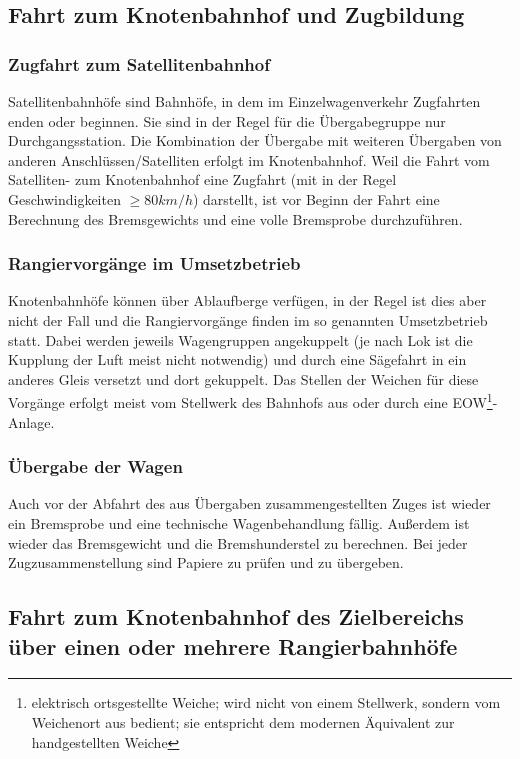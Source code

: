 \subsection{Fahrt zum Knotenbahnhof und Zugbildung}
\subsubsection{Zugfahrt zum Satellitenbahnhof}
Satellitenbahnhöfe sind Bahnhöfe, in dem im Einzelwagenverkehr Zugfahrten enden oder beginnen. Sie sind in der Regel für die Übergabegruppe nur Durchgangsstation. Die Kombination der Übergabe mit weiteren Übergaben von anderen Anschlüssen/Satelliten erfolgt im Knotenbahnhof. Weil die Fahrt vom Satelliten- zum Knotenbahnhof eine Zugfahrt (mit in der Regel Geschwindigkeiten $\ge 80 km/h$) darstellt, ist vor Beginn der Fahrt eine Berechnung des Bremsgewichts und eine volle Bremsprobe durchzuführen.%
\subsubsection{Rangiervorgänge im Umsetzbetrieb}
Knotenbahnhöfe können über Ablaufberge verfügen, in der Regel ist dies aber nicht der Fall und die Rangiervorgänge finden im so genannten Umsetzbetrieb statt. Dabei werden jeweils Wagengruppen angekuppelt (je nach Lok ist die Kupplung der Luft meist nicht notwendig) und durch eine Sägefahrt in ein anderes Gleis versetzt und dort gekuppelt. Das Stellen der Weichen für diese Vorgänge erfolgt meist vom Stellwerk des Bahnhofs aus oder durch eine EOW\footnote{elektrisch ortsgestellte Weiche; wird nicht von einem Stellwerk, sondern vom Weichenort aus bedient; sie entspricht dem modernen Äquivalent zur handgestellten Weiche}-Anlage.
\subsubsection{Übergabe der Wagen}
Auch vor der Abfahrt des aus Übergaben zusammengestellten Zuges ist wieder ein Bremsprobe und eine technische Wagenbehandlung fällig. Außerdem ist wieder das Bremsgewicht und die Bremshunderstel zu berechnen. Bei jeder Zugzusammenstellung sind Papiere zu prüfen und zu übergeben.

\subsection{Fahrt zum Knotenbahnhof des Zielbereichs über einen oder mehrere Rangierbahnhöfe}
